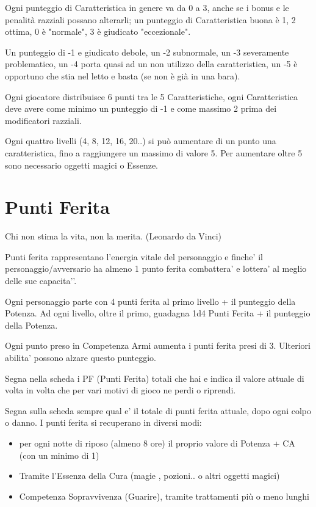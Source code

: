 \documentclass[a4paper,11pt,twoside,openany]{book}
\begin{document}
\smallskip

Ogni punteggio di Caratteristica in genere va da 0 a 3, anche se i bonus e le penalità razziali possano alterarli; un punteggio di Caratteristica buona è 1, 2 ottima, 0 è "normale", 3 è giudicato "eccezionale".

Un punteggio di -1 e giudicato debole, un -2 subnormale, un -3 severamente problematico, un -4 porta quasi ad un non utilizzo della caratteristica, un -5 è opportuno che stia nel letto e basta (se non è già in una bara).

Ogni giocatore distribuisce 6 punti tra le 5 Caratteristiche, ogni Caratteristica deve avere come minimo un punteggio di -1 e come massimo 2 prima dei modificatori razziali.

Ogni quattro livelli (4, 8, 12, 16, 20..) si può aumentare di un punto una caratteristica, fino a raggiungere un massimo di valore 5. Per aumentare oltre 5 sono necessario oggetti magici o Essenze.


\section{Punti Ferita}

\begin{tcolorbox}[enhanced,arc=5pt,boxrule=0.3pt]{Chi non stima la vita, non la merita. (Leonardo da Vinci)}\end{tcolorbox}\medskip


Punti ferita rappresentano l’energia vitale del personaggio e finche’ il personaggio/avversario ha almeno 1 punto ferita combattera’ e lottera’ al meglio delle sue capacita'’.

Ogni personaggio parte con 4 punti ferita al primo livello + il punteggio della Potenza.
Ad ogni livello, oltre il primo, guadagna 1d4 Punti Ferita + il punteggio della Potenza.

Ogni punto preso in Competenza Armi aumenta i punti ferita presi di 3. Ulteriori abilita’ possono alzare questo punteggio.

Segna nella scheda i PF (Punti Ferita) totali che hai e indica il valore attuale di volta in volta che per vari motivi di gioco ne perdi o riprendi.

Segna sulla scheda sempre qual e’ il totale di punti ferita attuale, dopo ogni colpo o danno.
I punti ferita si recuperano in diversi modi:

\begin{itemize}
	\item
	      per ogni notte di riposo (almeno 8 ore) il proprio valore di Potenza + CA (con un minimo di 1)
	\item
	      Tramite l'Essenza della Cura (magie , pozioni.. o altri oggetti magici)
	\item
	      Competenza Sopravvivenza (Guarire), tramite trattamenti più o meno lunghi
\end{itemize}
\end{document}
